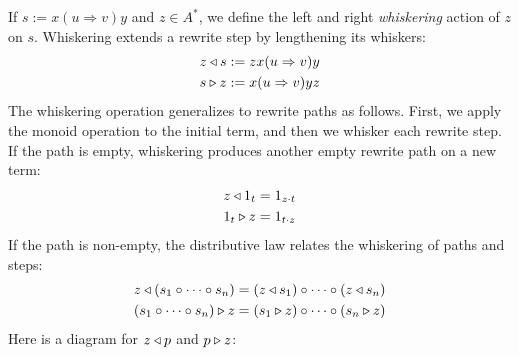 \documentclass[../generics]{subfiles}
\begin{document}
\begin{definition}
If $s:=x(u\Rightarrow v)y$ and $z\in A^*$, we define the \index{$\WL$}left and \index{$\WR$}right \emph{whiskering} action of $z$ on $s$. Whiskering extends a rewrite step by lengthening its whiskers:
\begin{gather*}
z\triangleleft s := zx(u\Rightarrow v)y\\
s\triangleright z := x(u\Rightarrow v)yz
\end{gather*}
The whiskering operation generalizes to rewrite paths as follows. First, we apply the monoid operation to the initial term, and then we whisker each rewrite step. If the path is empty, whiskering produces another empty rewrite path on a new term:
\begin{gather*}
z\triangleleft 1_t = 1_{z\cdot t}\\
1_t\triangleright z = 1_{t\cdot z}
\end{gather*}
If the path is non-empty, the distributive law relates the whiskering of paths and steps:
\begin{gather*}
z\triangleleft (s_1\circ\cdots\circ s_n) = (z\triangleleft s_1)\circ\cdots\circ (z\triangleleft s_n)\\
(s_1\circ\cdots\circ s_n)\triangleright z = (s_1\triangleright z)\circ\cdots\circ (s_n\triangleright z)
\end{gather*}
Here is a diagram for $z\triangleleft p$ and $p\triangleright z$:
\begin{center}
\end{center}


\end{definition}
\end{document}
